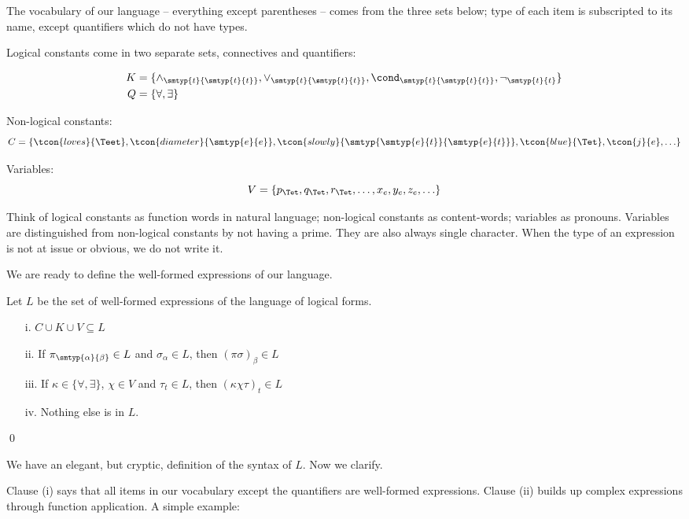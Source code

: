 \documentclass[11pt,a4paper]{article}
\begin{document}
The vocabulary of our language -- everything except parentheses -- comes from the three sets below; type of each item is subscripted to its name, except quantifiers which do not have types.

Logical constants come in two separate sets, connectives and quantifiers:  

\begin{align*}
K &  =  \{\land_{\smtyp{t}{\smtyp{t}{t}}},\lor_{\smtyp{t}{\smtyp{t}{t}}},\cond_{\smtyp{t}{\smtyp{t}{t}}},\neg_{\smtyp{t}{t}}\}\\
Q & =  \{\forall,\exists\} 
\end{align*}

Non-logical constants: 
$$C=\{\tcon{loves}{\Teet},
\tcon{diameter}{\smtyp{e}{e}},
\tcon{slowly}{\smtyp{\smtyp{e}{t}}{\smtyp{e}{t}}},
\tcon{blue}{\Tet},
\tcon{j}{e},
\ldots\}$$

Variables: $$V=\{p_{\Tet},q_{\Tet},r_{\Tet},\ldots,x_{e},y_{e},z_{e},\ldots\}$$

Think of logical constants as function words in natural language; non-logical constants as content-words; variables as pronouns. Variables are distinguished from non-logical constants by not having a prime. They are also always single character. When the type of an expression is not at issue or obvious, we do not write it.

We are ready to define the well-formed expressions of our language.


Let $L$ be the set of well-formed expressions of the language of logical forms.

\begin{udefinition}[Syntax of $L$]\label{Lsyn}
\begin{itemize}
\item[]
\item[i.] $C\cup K\cup V \subseteq L$
\item[ii.] If $\pi_{\smtyp{\alpha}{\beta}} \in L$ and $\sigma_{\alpha} \in L$, then $(\pi\sigma)_{\beta} \in L$
\item[iii.] If $\kappa \in \{\forall,\exists\}$, $\chi \in V$ and $\tau_{t} \in L$, then $(\kappa \chi \tau)_{t} \in L$
\item[iv.] Nothing else is in $L$.
\end{itemize}
\qed
\end{udefinition}

We have an elegant, but cryptic, definition of the syntax of $L$. Now we clarify. 

Clause (i) says that all items in our vocabulary except the quantifiers are well-formed expressions. 
Clause (ii) builds up complex expressions through function application. A simple example:
\end{document}
